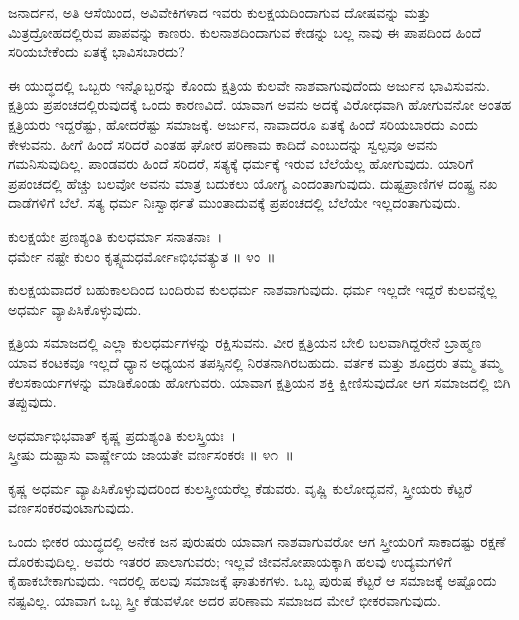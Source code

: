 \begin{artha}
ಜನಾರ್ದನ, ಅತಿ ಆಸೆಯಿಂದ, ಅವಿವೇಕಿಗಳಾದ ಇವರು ಕುಲಕ್ಷಯದಿಂದಾಗುವ ದೋಷವನ್ನು ಮತ್ತು ಮಿತ್ರದ್ರೋಹದಲ್ಲಿರುವ ಪಾಪವನ್ನು ಕಾಣರು. ಕುಲನಾಶದಿಂದಾಗುವ ಕೇಡನ್ನು ಬಲ್ಲ ನಾವು ಈ ಪಾಪದಿಂದ ಹಿಂದೆ ಸರಿಯಬೇಕೆಂದು ಏತಕ್ಕೆ ಭಾವಿಸಬಾರದು?
\end{artha}

ಈ ಯುದ್ಧದಲ್ಲಿ ಒಬ್ಬರು ಇನ್ನೊಬ್ಬರನ್ನು ಕೊಂದು ಕ್ಷತ್ರಿಯ ಕುಲವೇ ನಾಶವಾಗುವುದೆಂದು ಅರ್ಜುನ ಭಾವಿಸುವನು. ಕ್ಷತ್ರಿಯ ಪ್ರಪಂಚದಲ್ಲಿರುವುದಕ್ಕೆ ಒಂದು ಕಾರಣವಿದೆ. ಯಾವಾಗ ಅವನು ಅದಕ್ಕೆ ವಿರೋಧವಾಗಿ ಹೋಗುವನೋ ಅಂತಹ ಕ್ಷತ್ರಿಯರು ಇದ್ದರೆಷ್ಟು, ಹೋದರೆಷ್ಟು ಸಮಾಜಕ್ಕೆ. ಅರ್ಜುನ, ನಾವಾದರೂ ಏತಕ್ಕೆ ಹಿಂದೆ ಸರಿಯಬಾರದು ಎಂದು ಕೇಳುವನು. ಹೀಗೆ ಹಿಂದೆ ಸರಿದರೆ ಎಂತಹ ಘೋರ ಪರಿಣಾಮ ಕಾದಿದೆ ಎಂಬುದನ್ನು ಸ್ವಲ್ಪವೂ ಅವನು ಗಮನಿಸುವುದಿಲ್ಲ. ಪಾಂಡವರು ಹಿಂದೆ ಸರಿದರೆ, ಸತ್ಯಕ್ಕೆ ಧರ್ಮಕ್ಕೆ ಇರುವ ಬೆಲೆಯೆಲ್ಲ ಹೋಗುವುದು. ಯಾರಿಗೆ ಪ್ರಪಂಚದಲ್ಲಿ ಹೆಚ್ಚು ಬಲವೋ ಅವನು ಮಾತ್ರ ಬದುಕಲು ಯೋಗ್ಯ ಎಂದಂತಾಗುವುದು. ದುಷ್ಟಪ್ರಾಣಿಗಳ ದಂಷ್ಟ್ರ ನಖ ದಾಡೆಗಳಿಗೆ ಬೆಲೆ. ಸತ್ಯ ಧರ್ಮ ನಿಃಸ್ವಾರ್ಥತೆ ಮುಂತಾದುವಕ್ಕೆ ಪ್ರಪಂಚದಲ್ಲಿ ಬೆಲೆಯೇ ಇಲ್ಲದಂತಾಗುವುದು.

\begin{shloka}
ಕುಲಕ್ಷಯೇ ಪ್ರಣಶ್ಯಂತಿ ಕುಲಧರ್ಮಾ ಸನಾತನಾಃ~।\\ಧರ್ಮೇ ನಷ್ಟೇ ಕುಲಂ ಕೃತ್ಸ್ನಮಧರ್ಮೋsಭಿಭವತ್ಯುತ \hfill॥ ೪ಂ~॥
\end{shloka}

\begin{artha}
ಕುಲಕ್ಷಯವಾದರೆ ಬಹುಕಾಲದಿಂದ ಬಂದಿರುವ ಕುಲಧರ್ಮ ನಾಶವಾಗುವುದು. ಧರ್ಮ ಇಲ್ಲದೇ ಇದ್ದರೆ ಕುಲವನ್ನೆಲ್ಲ ಅಧರ್ಮ ವ್ಯಾಪಿಸಿಕೊಳ್ಳುವುದು.
\end{artha}

ಕ್ಷತ್ರಿಯ ಸಮಾಜದಲ್ಲಿ ಎಲ್ಲಾ ಕುಲಧರ್ಮಗಳನ್ನು ರಕ್ಷಿಸುವನು. ವೀರ ಕ್ಷತ್ರಿಯನ ಬೇಲಿ ಬಲವಾಗಿದ್ದರೇನೆ ಬ್ರಾಹ್ಮಣ ಯಾವ ಕಂಟಕವೂ ಇಲ್ಲದೆ ಧ್ಯಾನ ಅಧ್ಯಯನ ತಪಸ್ಸಿನಲ್ಲಿ ನಿರತನಾಗಿರಬಹುದು. ವರ್ತಕ ಮತ್ತು ಶೂದ್ರರು ತಮ್ಮ ತಮ್ಮ ಕೆಲಸಕಾರ್ಯಗಳನ್ನು ಮಾಡಿಕೊಂಡು ಹೋಗುವರು. ಯಾವಾಗ ಕ್ಷತ್ರಿಯನ ಶಕ್ತಿ ಕ್ಷೀಣಿಸುವುದೋ ಆಗ ಸಮಾಜದಲ್ಲಿ ಬಿಗಿ ತಪ್ಪುವುದು.

\begin{shloka}
ಅಧರ್ಮಾಭಿಭವಾತ್ ಕೃಷ್ಣ ಪ್ರದುಶ್ಯಂತಿ ಕುಲಸ್ತ್ರಿಯಃ~।\\ಸ್ತ್ರೀಷು ದುಷ್ಟಾಸು ವಾರ್ಷ್ಣೇಯ ಜಾಯತೇ ವರ್ಣಸಂಕರಃ \hfill॥ ೪೧~॥
\end{shloka}

\begin{artha}
ಕೃಷ್ಣ ಅಧರ್ಮ ವ್ಯಾಪಿಸಿಕೊಳ್ಳುವುದರಿಂದ ಕುಲಸ್ತ್ರೀಯರೆಲ್ಲ ಕೆಡುವರು. ವೃಷ್ಣಿ ಕುಲೋದ್ಭವನೆ, ಸ್ತ್ರೀಯರು ಕೆಟ್ಟರೆ ವರ್ಣಸಂಕರವುಂಟಾಗುವುದು.
\end{artha}

ಒಂದು ಭೀಕರ ಯುದ್ಧದಲ್ಲಿ ಅನೇಕ ಜನ ಪುರುಷರು ಯಾವಾಗ ನಾಶವಾಗುವರೋ ಆಗ ಸ್ತ್ರೀಯರಿಗೆ ಸಾಕಾದಷ್ಟು ರಕ್ಷಣೆ ದೊರಕುವುದಿಲ್ಲ. ಅವರು ಇತರರ ಪಾಲಾಗುವರು; ಇಲ್ಲವೆ ಜೀವನೋಪಾಯಕ್ಕಾಗಿ ಹಲವು ಉದ್ಯಮಗಳಿಗೆ ಕೈಹಾಕಬೇಕಾಗುವುದು. ಇದರಲ್ಲಿ ಹಲವು ಸಮಾಜಕ್ಕೆ ಘಾತುಕಗಳು. ಒಬ್ಬ ಪುರುಷ ಕೆಟ್ಟರೆ ಆ ಸಮಾಜಕ್ಕೆ ಅಷ್ಟೊಂದು ನಷ್ಟವಿಲ್ಲ. ಯಾವಾಗ ಒಬ್ಬ ಸ್ತ್ರೀ ಕೆಡುವಳೋ ಅದರ ಪರಿಣಾಮ ಸಮಾಜದ ಮೇಲೆ ಭೀಕರವಾಗುವುದು.

